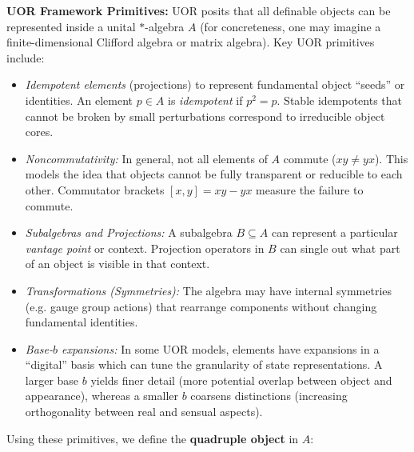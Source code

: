 \documentclass[12pt]{article}
\begin{document}
\textbf{UOR Framework Primitives:} UOR posits that all definable objects can be represented inside a unital $*$-algebra $A$ (for concreteness, one may imagine a finite-dimensional Clifford algebra or matrix algebra). Key UOR primitives include:
\begin{itemize}
    \item \emph{Idempotent elements} (projections) to represent fundamental object ``seeds'' or identities. An element $p\in A$ is \emph{idempotent} if $p^2 = p$. Stable idempotents that cannot be broken by small perturbations correspond to irreducible object cores.
    \item \emph{Noncommutativity:} In general, not all elements of $A$ commute ($xy \neq yx$). This models the idea that objects cannot be fully transparent or reducible to each other. Commutator brackets $[x,y]=xy - yx$ measure the failure to commute.
    \item \emph{Subalgebras and Projections:} A subalgebra $B \subseteq A$ can represent a particular \emph{vantage point} or context. Projection operators in $B$ can single out what part of an object is visible in that context.
    \item \emph{Transformations (Symmetries):} The algebra may have internal symmetries (e.g. gauge group actions) that rearrange components without changing fundamental identities.
    \item \emph{Base-$b$ expansions:} In some UOR models, elements have expansions in a ``digital'' basis which can tune the granularity of state representations. A larger base $b$ yields finer detail (more potential overlap between object and appearance), whereas a smaller $b$ coarsens distinctions (increasing orthogonality between real and sensual aspects).
\end{itemize}

Using these primitives, we define the \textbf{quadruple object} in $A$:
\end{document}
